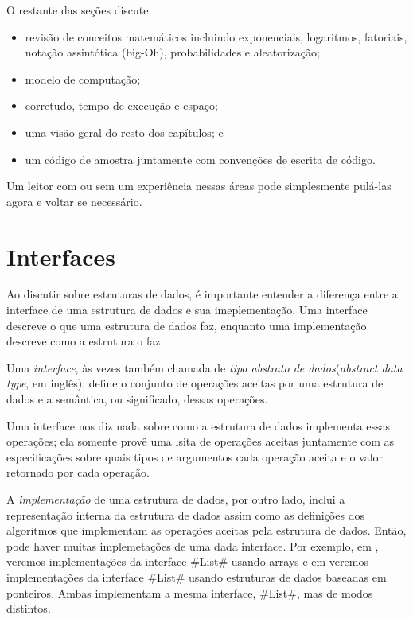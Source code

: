 O restante das seções discute:

\begin{itemize}
  \item revisão de conceitos matemáticos incluindo exponenciais, logaritmos, fatoriais, notação assintótica (big-Oh), probabilidades e aleatorização;
  \item modelo de computação;
  \item corretudo, tempo de execução e espaço;
  \item uma visão geral do resto dos capítulos; e 
  \item um código de amostra juntamente com convenções de escrita de código.
\end{itemize}

Um leitor com ou sem um experiência nessas áreas pode simplesmente pulá-las agora e voltar se necessário.

\section{Interfaces}
Ao discutir sobre estruturas de dados, é importante entender a diferença entre a interface de uma estrutura de dados e sua imeplementação. 
Uma interface descreve o que uma estrutura de dados faz, enquanto uma implementação descreve como a estrutura o faz.

Uma \emph{interface},
%
%
às vezes também chamada de \emph{tipo abstrato de dados}(\emph{abstract data type}, em inglês),
define o conjunto de operações aceitas por uma estrutura de dados e a semântica, ou significado, dessas operações.

Uma interface nos diz nada sobre como a estrutura de dados implementa essas operações; ela somente provê uma lsita de operações aceitas juntamente com as especificações sobre quais tipos de argumentos cada operação aceita e o valor retornado por cada operação.

A \emph{implementação} de uma estrutura de dados, por outro lado, inclui a representação interna da estrutura de dados assim como as definições dos algoritmos que implementam as operações aceitas pela estrutura de dados. 
Então, pode haver muitas implemetações de uma dada interface.
Por exemplo, em , veremos implementações da interface #List# usando arrays e em  veremos implementações da interface #List# usando estruturas de dados baseadas em ponteiros. Ambas implementam a mesma interface, #List#, mas de modos distintos.


